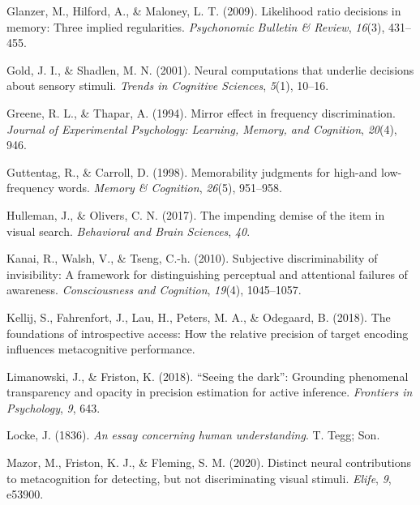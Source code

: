 \documentclass[12pt,twoside]{reedthesis}
\begin{document}
\leavevmode\hypertarget{ref-glanzer2009likelihood}{}%
Glanzer, M., Hilford, A., \& Maloney, L. T. (2009). Likelihood ratio decisions in memory: Three implied regularities. \emph{Psychonomic Bulletin \& Review}, \emph{16}(3), 431--455.

\leavevmode\hypertarget{ref-gold2001neural}{}%
Gold, J. I., \& Shadlen, M. N. (2001). Neural computations that underlie decisions about sensory stimuli. \emph{Trends in Cognitive Sciences}, \emph{5}(1), 10--16.

\leavevmode\hypertarget{ref-greene1994mirror}{}%
Greene, R. L., \& Thapar, A. (1994). Mirror effect in frequency discrimination. \emph{Journal of Experimental Psychology: Learning, Memory, and Cognition}, \emph{20}(4), 946.

\leavevmode\hypertarget{ref-guttentag1998memorability}{}%
Guttentag, R., \& Carroll, D. (1998). Memorability judgments for high-and low-frequency words. \emph{Memory \& Cognition}, \emph{26}(5), 951--958.

\leavevmode\hypertarget{ref-hulleman2017impending}{}%
Hulleman, J., \& Olivers, C. N. (2017). The impending demise of the item in visual search. \emph{Behavioral and Brain Sciences}, \emph{40}.

\leavevmode\hypertarget{ref-kanai2010subjective}{}%
Kanai, R., Walsh, V., \& Tseng, C.-h. (2010). Subjective discriminability of invisibility: A framework for distinguishing perceptual and attentional failures of awareness. \emph{Consciousness and Cognition}, \emph{19}(4), 1045--1057.

\leavevmode\hypertarget{ref-kellij2018foundations}{}%
Kellij, S., Fahrenfort, J., Lau, H., Peters, M. A., \& Odegaard, B. (2018). The foundations of introspective access: How the relative precision of target encoding influences metacognitive performance.

\leavevmode\hypertarget{ref-limanowski2018seeing}{}%
Limanowski, J., \& Friston, K. (2018). ``Seeing the dark'': Grounding phenomenal transparency and opacity in precision estimation for active inference. \emph{Frontiers in Psychology}, \emph{9}, 643.

\leavevmode\hypertarget{ref-locke1836essay}{}%
Locke, J. (1836). \emph{An essay concerning human understanding}. T. Tegg; Son.

\leavevmode\hypertarget{ref-mazor2020distinct}{}%
Mazor, M., Friston, K. J., \& Fleming, S. M. (2020). Distinct neural contributions to metacognition for detecting, but not discriminating visual stimuli. \emph{Elife}, \emph{9}, e53900.
\end{document}
